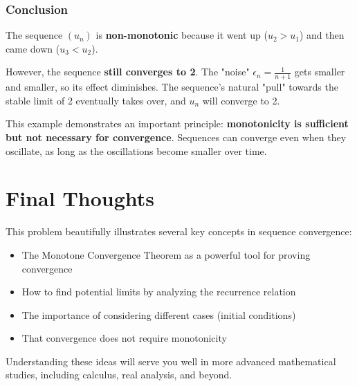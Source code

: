 \documentclass[12pt,a4paper]{article}
\theoremstyle{definition}
\begin{document}
\subsubsection{Conclusion}

The sequence $(u_n)$ is \textbf{non-monotonic} because it went up ($u_2 > u_1$) and then came down ($u_3 < u_2$).

However, the sequence \textbf{still converges to 2}. The "noise" $\epsilon_n = \frac{1}{n+1}$ gets smaller and smaller, so its effect diminishes. The sequence's natural "pull" towards the stable limit of 2 eventually takes over, and $u_n$ will converge to 2.

This example demonstrates an important principle: \textbf{monotonicity is sufficient but not necessary for convergence}. Sequences can converge even when they oscillate, as long as the oscillations become smaller over time.

\section{Final Thoughts}

This problem beautifully illustrates several key concepts in sequence convergence:
\begin{itemize}
    \item The Monotone Convergence Theorem as a powerful tool for proving convergence
    \item How to find potential limits by analyzing the recurrence relation
    \item The importance of considering different cases (initial conditions)
    \item That convergence does not require monotonicity
\end{itemize}

Understanding these ideas will serve you well in more advanced mathematical studies, including calculus, real analysis, and beyond.
\end{document}

